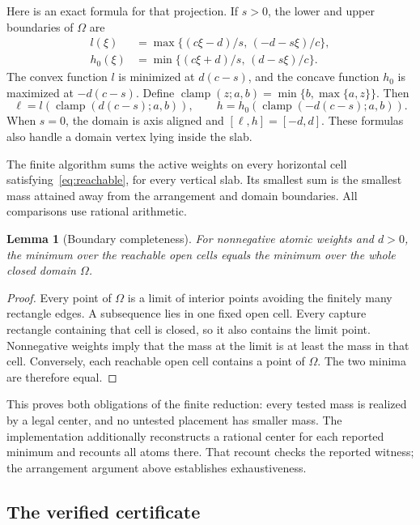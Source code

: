 \documentclass[11pt]{article}
\newtheorem{lemma}[theorem]{Lemma}
\begin{document}
Here is an exact formula for that projection. If $s>0$, the lower and upper
boundaries of $\Omega$ are
\begin{align*}
  l(\xi)&=\max\{(c\xi-d)/s,\,(-d-s\xi)/c\},\\
  h_0(\xi)&=\min\{(c\xi+d)/s,\,(d-s\xi)/c\}.
\end{align*}
The convex function $l$ is minimized at $d(c-s)$, and the concave function
$h_0$ is maximized at $-d(c-s)$. Define
$\operatorname{clamp}(z;a,b)=\min\{b,\max\{a,z\}\}$. Then
\begin{equation}\label{eq:projection}
  \ell=l(\operatorname{clamp}(d(c-s);a,b)),\qquad
  h=h_0(\operatorname{clamp}(-d(c-s);a,b)).
\end{equation}
When $s=0$, the domain is axis aligned and $[\ell,h]=[-d,d]$.
These formulas also handle a domain vertex lying inside the slab.

The finite algorithm sums the active weights on every horizontal cell
satisfying~\eqref{eq:reachable}, for every vertical slab. Its smallest sum is
the smallest mass attained away from the arrangement and domain boundaries.
All comparisons use rational arithmetic.

\begin{lemma}[Boundary completeness]\label{lem:boundary}
For nonnegative atomic weights and $d>0$, the minimum over the reachable open
cells equals the minimum over the whole closed domain $\Omega$.
\end{lemma}

\begin{proof}
Every point of $\Omega$ is a limit of interior points avoiding the finitely
many rectangle edges. A subsequence lies in one fixed open cell. Every
capture rectangle containing that cell is closed, so it also contains the
limit point. Nonnegative weights imply that the mass at the limit is at
least the mass in that cell. Conversely, each reachable open cell contains
a point of $\Omega$. The two minima are therefore equal.
\end{proof}

This proves both obligations of the finite reduction: every tested mass is
realized by a legal center, and no untested placement has smaller mass. The
implementation additionally reconstructs a rational center for each reported
minimum and recounts all atoms there. That recount checks the reported witness;
the arrangement argument above establishes exhaustiveness.

\subsection{The verified certificate}
\end{document}
